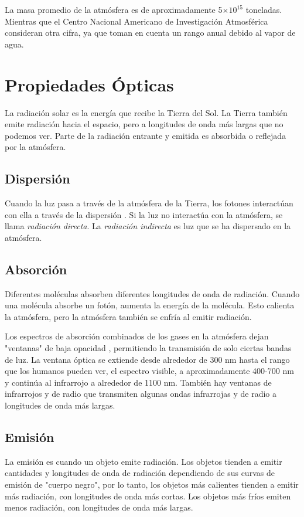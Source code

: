 \documentclass[12pt]{article}
\begin{document}
La masa promedio de la atmósfera es de aproximadamente 5$\times 10 ^{15}$ toneladas. Mientras que el Centro Nacional Americano de Investigación Atmosférica consideran otra cifra, ya que toman en cuenta un rango anual debido al vapor de agua.

\section{Propiedades Ópticas}
La radiación solar es la energía que recibe la Tierra del Sol. La Tierra también emite radiación hacia el espacio, pero a longitudes de onda más largas que no podemos ver. Parte de la radiación entrante y emitida es absorbida o reflejada por la atmósfera. 

\subsection{Dispersión}
Cuando la luz pasa a través de la atmósfera de la Tierra, los fotones interactúan con ella a través de la dispersión . Si la luz no interactúa con la atmósfera, se llama \textit{radiación directa}. La \textit{radiación indirecta} es luz que se ha dispersado en la atmósfera.

\subsection{Absorción}
Diferentes moléculas absorben diferentes longitudes de onda de radiación. Cuando una molécula absorbe un fotón, aumenta la energía de la molécula. Esto calienta la atmósfera, pero la atmósfera también se enfría al emitir radiación.

Los espectros de absorción combinados de los gases en la atmósfera dejan "ventanas" de baja opacidad , permitiendo la transmisión de solo ciertas bandas de luz. La ventana óptica se extiende desde alrededor de 300 nm hasta el rango que los humanos pueden ver, el espectro visible, a aproximadamente 400-700 nm y continúa al infrarrojo a alrededor de 1100 nm. También hay ventanas de infrarrojos y de radio que transmiten algunas ondas infrarrojas y de radio a longitudes de onda más largas.

\subsection{Emisión}
La emisión es cuando un objeto emite radiación. Los objetos tienden a emitir cantidades y longitudes de onda de radiación dependiendo de sus curvas de emisión de "cuerpo negro", por lo tanto, los objetos más calientes tienden a emitir más radiación, con longitudes de onda más cortas. Los objetos más fríos emiten menos radiación, con longitudes de onda más largas.
\end{document}
